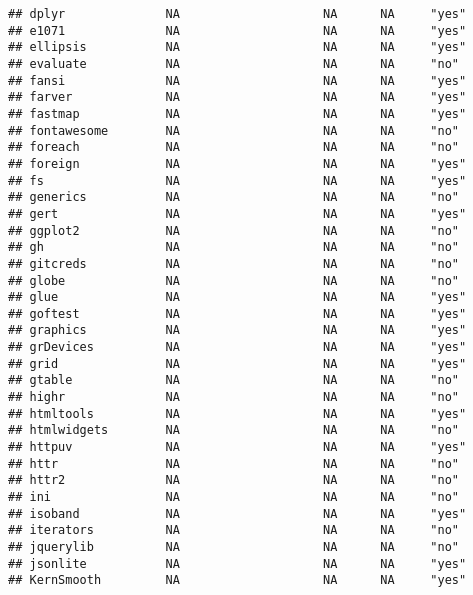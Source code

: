\documentclass[
]{article}
\begin{document}
\begin{verbatim}
## dplyr              NA                    NA      NA     "yes"           
## e1071              NA                    NA      NA     "yes"           
## ellipsis           NA                    NA      NA     "yes"           
## evaluate           NA                    NA      NA     "no"            
## fansi              NA                    NA      NA     "yes"           
## farver             NA                    NA      NA     "yes"           
## fastmap            NA                    NA      NA     "yes"           
## fontawesome        NA                    NA      NA     "no"            
## foreach            NA                    NA      NA     "no"            
## foreign            NA                    NA      NA     "yes"           
## fs                 NA                    NA      NA     "yes"           
## generics           NA                    NA      NA     "no"            
## gert               NA                    NA      NA     "yes"           
## ggplot2            NA                    NA      NA     "no"            
## gh                 NA                    NA      NA     "no"            
## gitcreds           NA                    NA      NA     "no"            
## globe              NA                    NA      NA     "no"            
## glue               NA                    NA      NA     "yes"           
## goftest            NA                    NA      NA     "yes"           
## graphics           NA                    NA      NA     "yes"           
## grDevices          NA                    NA      NA     "yes"           
## grid               NA                    NA      NA     "yes"           
## gtable             NA                    NA      NA     "no"            
## highr              NA                    NA      NA     "no"            
## htmltools          NA                    NA      NA     "yes"           
## htmlwidgets        NA                    NA      NA     "no"            
## httpuv             NA                    NA      NA     "yes"           
## httr               NA                    NA      NA     "no"            
## httr2              NA                    NA      NA     "no"            
## ini                NA                    NA      NA     "no"            
## isoband            NA                    NA      NA     "yes"           
## iterators          NA                    NA      NA     "no"            
## jquerylib          NA                    NA      NA     "no"            
## jsonlite           NA                    NA      NA     "yes"           
## KernSmooth         NA                    NA      NA     "yes"           

\end{verbatim}
\end{document}
